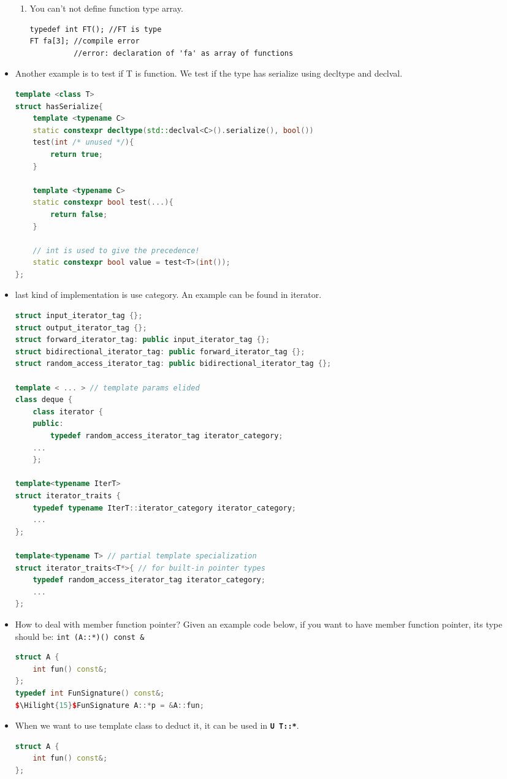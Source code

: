 \documentclass[a4paper,11pt,twoside]{book}
\newcommand{\Hilight}[1]{\makebox[0pt][l]{\color{yellow}\rule[-3pt]{#1em}{11pt}}}
\newcommand{\Hilight}[1]{}
\begin{document}
\begin{itemize}
\begin{enumerate}
	\item You can't not define function type array.
\begin{lstlisting}
typedef int FT(); //FT is type
FT fa[3]; //compile error
          //error: declaration of 'fa' as array of functions
\end{lstlisting}
\end{enumerate}

\item  Another example is to test if T is function. We test if the type has serialize using decltype and declval.

\begin{lstlisting}[frame=single, language=c++]
template <class T> 
struct hasSerialize{
	template <typename C>
	static constexpr decltype(std::declval<C>().serialize(), bool()) 
	test(int /* unused */){
		return true;
	}
	
	template <typename C>
	static constexpr bool test(...){
		return false;
	}
	
	// int is used to give the precedence!
	static constexpr bool value = test<T>(int());
};
\end{lstlisting}
	
\item last kind of implementation is use category. An example can be found in iterator.
	
\begin{lstlisting}[frame=single, language=c++]
struct input_iterator_tag {};
struct output_iterator_tag {};
struct forward_iterator_tag: public input_iterator_tag {};
struct bidirectional_iterator_tag: public forward_iterator_tag {};
struct random_access_iterator_tag: public bidirectional_iterator_tag {};
	
template < ... > // template params elided
class deque {
	class iterator {
	public:
		typedef random_access_iterator_tag iterator_category;
	...
	};
	
template<typename IterT>
struct iterator_traits {
	typedef typename IterT::iterator_category iterator_category;
	...
};
	
template<typename T> // partial template specialization
struct iterator_traits<T*>{ // for built-in pointer types
	typedef random_access_iterator_tag iterator_category;
	...
};
\end{lstlisting}
	
	
	\item How to deal with member function pointer? Given an example code below, if you want to have member function pointer, its type should be: \texttt{int (A::*)() const \&} 
\begin{lstlisting}[frame=single, language=c++]
struct A {
	int fun() const&;
};
typedef int FunSignature() const&;
$\Hilight{15}$FunSignature A::*p = &A::fun;
\end{lstlisting}
\item When we want to use template class to deduct it, it can be used in \textbf{\texttt{U T::*}}.
\begin{lstlisting}[frame=single, language=c++]
struct A {
	int fun() const&;
};


\end{lstlisting}
\end{itemize}
\end{document}
